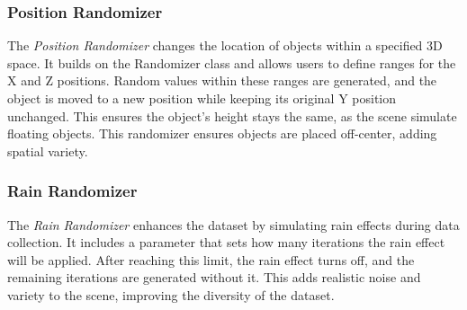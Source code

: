 \subsubsection{Position Randomizer}
The \textit{Position Randomizer} changes the location of objects within a specified 3D space. It builds on the Randomizer class and allows users to define ranges for the X and Z positions. Random values within these ranges are generated, and the object is moved to a new position while keeping its original Y position unchanged. This ensures the object's height stays the same, as the scene simulate floating objects. This randomizer ensures objects are placed off-center, adding spatial variety.

\subsubsection{Rain Randomizer}
The \textit{Rain Randomizer} enhances the dataset by simulating rain effects during data collection. It includes a parameter that sets how many iterations the rain effect will be applied. After reaching this limit, the rain effect turns off, and the remaining iterations are generated without it. This adds realistic noise and variety to the scene, improving the diversity of the dataset.

